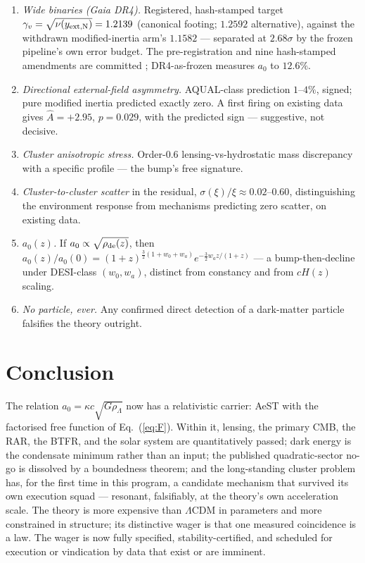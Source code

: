 \documentclass[aps,prd,twocolumn,10pt,nofootinbib,superscriptaddress]{revtex4-2}
\begin{document}
\begin{enumerate}
\item \emph{Wide binaries (Gaia DR4).} Registered, hash-stamped target
$\gamma_v=\sqrt{\nu(y_{\rm ext,N})}=1.2139$ (canonical footing; $1.2592$ alternative), against the
withdrawn modified-inertia arm's $1.1582$ --- separated at $2.68\sigma$ by the frozen pipeline's own
error budget. The pre-registration and nine hash-stamped amendments are committed \cite{repo};
DR4-as-frozen measures $a_0$ to $12.6\%$.
\item \emph{Directional external-field asymmetry.} AQUAL-class prediction $1$--$4\%$, signed; pure
modified inertia predicted exactly zero. A first firing on existing data gives $\hat A=+2.95$,
$p=0.029$, with the predicted sign --- suggestive, not decisive.
\item \emph{Cluster anisotropic stress.} Order-$0.6$ lensing-vs-hydrostatic mass discrepancy with a
specific profile --- the bump's free signature.
\item \emph{Cluster-to-cluster scatter} in the residual, $\sigma(\xi)/\xi\approx0.02$--$0.60$,
distinguishing the environment response from mechanisms predicting zero scatter, on existing data.
\item \emph{$a_0(z)$.} If $a_0\propto\sqrt{\rho_{\rm de}(z)}$, then
$a_0(z)/a_0(0)=(1+z)^{\frac32(1+w_0+w_a)}e^{-\frac32 w_a z/(1+z)}$ --- a bump-then-decline under
DESI-class $(w_0,w_a)$, distinct from constancy and from $cH(z)$ scaling.
\item \emph{No particle, ever.} Any confirmed direct detection of a dark-matter particle falsifies
the theory outright.
\end{enumerate}

\section{Conclusion}

The relation $a_0=\kappa c\sqrt{G\rho_\Lambda}$ now has a relativistic carrier: AeST with the
factorised free function of Eq.~(\ref{eq:F}). Within it, lensing, the primary CMB, the RAR, the
BTFR, and the solar system are quantitatively passed; dark energy is the condensate minimum rather
than an input; the published quadratic-sector no-go is dissolved by a boundedness theorem; and the
long-standing cluster problem has, for the first time in this program, a candidate mechanism that
survived its own execution squad --- resonant, falsifiably, at the theory's own acceleration scale.
The theory is more expensive than $\Lambda$CDM in parameters and more constrained in structure; its
distinctive wager is that one measured coincidence is a law. The wager is now fully specified,
stability-certified, and scheduled for execution or vindication by data that exist or are imminent.
\end{document}
